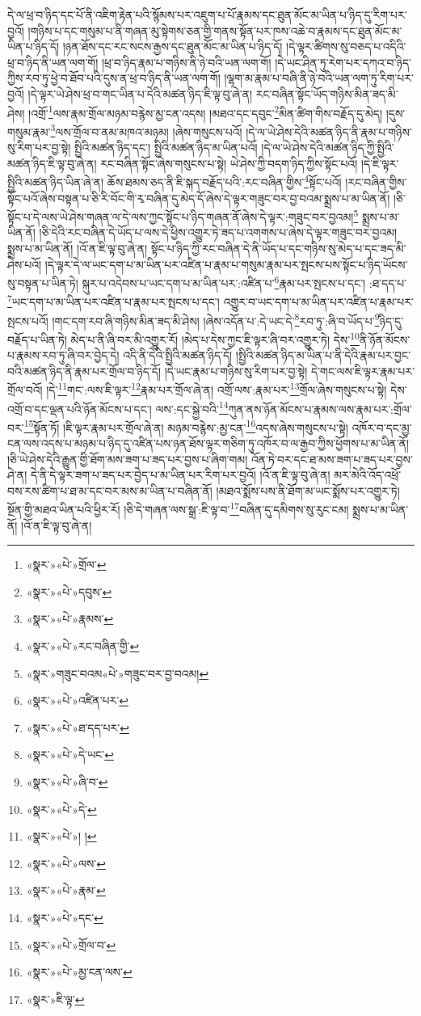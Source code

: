 དེ་ལ་ཕྲ་བ་ཉིད་དང་པོ་ནི་འཇིག་རྟེན་པའི་སྙོམས་པར་འཇུག་པ་པོ་རྣམས་དང་ཐུན་མོང་མ་ཡིན་པ་ཉིད་དུ་རིག་པར་བྱའོ། །གཉིས་པ་དང་གསུམ་པ་ནི་གཞན་མུ་སྟེགས་ཅན་གྱི་གནས་སྟོན་པར་ཁས་འཆེ་བ་རྣམས་དང་ཐུན་མོང་མ་ཡིན་པ་ཉིད་དོ། །ཉན་ཐོས་དང་རང་སངས་རྒྱས་དང་ཐུན་མོང་མ་ཡིན་པ་ཉིད་དོ། །དེ་ལྟར་ཚིགས་སུ་བཅད་པ་འདིའི་ཕྲ་བ་ཉིད་ནི་ཡན་ལག་གོ། །ཕྲ་བ་ཉིད་རྣམ་པ་གཉིས་ནི་ཉེ་བའི་ཡན་ལག་གོ། །དེ་ཡང་ཤིན་ཏུ་རེག་པར་དཀའ་བ་ཉིད་ཀྱིས་རབ་ཏུ་ཕྱེ་བ་ཐོབ་པའི་དུས་ན་ཕྲ་བ་ཉིད་ནི་ཡན་ལག་གོ། །ལྷག་མ་རྣམ་པ་བཞི་ནི་ཉེ་བའི་ཡན་ལག་ཏུ་རིག་པར་བྱའོ། །དེ་ལྟར་ཡེ་ཤེས་ཕྲ་བ་གང་ཡིན་པ་དེའི་མཚན་ཉིད་ཇི་ལྟ་བུ་ཞེ་ན། རང་བཞིན་སྟོང་ཡོད་གཉིས་མིན་ཟད་མི་ཤེས། །འགྲོ་\footnote{«སྣར་»«པེ་»གྲོལ་}ལས་རྣམ་གྲོལ་མཉམ་བརྙེས་མྱ་ངན་འདས། །མཐའ་དང་དབུང་\footnote{«སྣར་»«པེ་»དབུས་}མིན་ཚིག་གིས་བརྗོད་དུ་མེད། །དུས་གསུམ་རྣམ་\footnote{«སྣར་»«པེ་»རྣམས་}ལས་གྲོལ་བ་ནམ་མཁའ་མཉམ། །ཞེས་གསུངས་པའོ། །དེ་ལ་ཡེ་ཤེས་དེའི་མཚན་ཉིད་ནི་རྣམ་པ་གཉིས་སུ་རིག་པར་བྱ་སྟེ། སྤྱིའི་མཚན་ཉིད་དང་། སྤྱིའི་མཚན་ཉིད་མ་ཡིན་པའོ། །དེ་ལ་ཡེ་ཤེས་དེའི་མཚན་ཉིད་ཀྱི་སྤྱིའི་མཚན་ཉིད་ཇི་ལྟ་བུ་ཞེ་ན། རང་བཞིན་སྟོང་ཞེས་གསུངས་པ་སྟེ། ཡེ་ཤེས་ཀྱི་བདག་ཉིད་ཀྱིས་སྟོང་པའོ། །དེ་ཇི་ལྟར་སྤྱིའི་མཚན་ཉིད་ཡིན་ཞེ་ན། ཆོས་ཐམས་ཅད་ནི་ཇི་སྐད་བརྗོད་པའི་:རང་བཞིན་གྱིས་\footnote{«སྣར་»«པེ་»རང་བཞིན་གྱི་}སྟོང་པའོ། །རང་བཞིན་གྱིས་སྟོང་པའོ་ཞེས་བསྟན་པ་ཅི་རི་བོང་གི་རྭ་བཞིན་དུ་མེད་དོ་ཞེས་དེ་ལྟར་གཟུང་བར་བྱ་བའམ་སྨྲས་པ་མ་ཡིན་ནོ། །ཅི་སྟོང་པ་དེ་ལས་ཡེ་ཤེས་གཞན་ལ་དེ་ལས་ཀྱང་སྟོང་པ་ཉིད་གཞན་ནོ་ཞེས་དེ་ལྟར་:གཟུང་བར་བྱའམ།\footnote{«སྣར་»གཟུང་བའམ«པེ་»གཟུང་བར་བྱ་བའམ།} སྨྲས་པ་མ་ཡིན་ནོ། །ཅི་དེའི་རང་བཞིན་དེ་ཡོད་པ་ལས་དེ་ཕྱིས་འགྱུར་ཏེ་ཟད་པ་འགགས་པ་ཞེས་དེ་ལྟར་གཟུང་བར་བྱའམ། སྨྲས་པ་མ་ཡིན་ནོ། །འོ་ན་ཇི་ལྟ་བུ་ཞེ་ན། སྟོང་པ་ཉིད་ཀྱི་རང་བཞིན་དེ་ནི་ཡོད་པ་དང་གཉིས་སུ་མེད་པ་དང་ཟད་མི་ཤེས་པའོ། །དེ་ལྟར་དེ་ལ་ཡང་དག་པ་མ་ཡིན་པར་འཛིན་པ་རྣམ་པ་གསུམ་རྣམ་པར་སྤངས་པས་སྟོང་པ་ཉིད་ཡོངས་སུ་བསྟན་པ་ཡིན་ཏེ། སྐུར་པ་འདེབས་པ་ཡང་དག་པ་མ་ཡིན་པར་:འཛིན་པ་\footnote{«སྣར་»«པེ་»འཛིན་པར་}རྣམ་པར་སྤངས་པ་དང་། :ཐ་དད་པ་\footnote{«སྣར་»«པེ་»ཐ་དད་པར་}ཡང་དག་པ་མ་ཡིན་པར་འཛིན་པ་རྣམ་པར་སྤངས་པ་དང་། འགྱུར་བ་ཡང་དག་པ་མ་ཡིན་པར་འཛིན་པ་རྣམ་པར་སྤངས་པའོ། །གང་དག་རབ་ཞི་གཉིས་མིན་ཟད་མི་ཤེས། །ཞེས་འདོན་པ་:དེ་ཡང་དེ་\footnote{«སྣར་»«པེ་»དེ་ཡང་}རབ་ཏུ་:ཞི་བ་ཡོད་པ་\footnote{«སྣར་»«པེ་»ཞི་བ་}ཉིད་དུ་བརྗོད་པ་ཡིན་ཏེ། མེད་པ་ནི་ཞི་བར་མི་འགྱུར་རོ། །མེད་པ་དེས་ཀྱང་ཇི་ལྟར་ཞི་བར་འགྱུར་ཏེ། དེས་\footnote{«སྣར་»«པེ་»དེ་}ནི་ཉོན་མོངས་པ་རྣམས་རབ་ཏུ་ཞི་བར་བྱེད་དེ། འདི་ནི་དེའི་སྤྱིའི་མཚན་ཉིད་དོ། །སྤྱིའི་མཚན་ཉིད་མ་ཡིན་པ་ནི་དེའི་རྣམ་པར་བྱང་བའི་མཚན་ཉིད་ནི་རྣམ་པར་གྲོལ་བ་ཉིད་དོ། །དེ་ཡང་རྣམ་པ་གཉིས་སུ་རིག་པར་བྱ་སྟེ། དེ་གང་ལས་ཇི་ལྟར་རྣམ་པར་གྲོལ་བའོ། །དེ་\footnote{«སྣར་»«པེ་»། །}གང་:ལས་ཇི་ལྟར་\footnote{«སྣར་»«པེ་»ལས་}རྣམ་པར་གྲོལ་ཞེ་ན། འགྲོ་ལས་:རྣམ་པར་\footnote{«སྣར་»«པེ་»རྣམ་}གྲོལ་ཞེས་གསུངས་པ་སྟེ། དེས་འགྲོ་བ་དང་ལྡན་པའི་ཉོན་མོངས་པ་དང་། ལས་:དང་སྐྱེ་བའི་\footnote{«སྣར་»«པེ་»དང་}ཀུན་ནས་ཉོན་མོངས་པ་རྣམས་ལས་རྣམ་པར་:གྲོལ་བར་\footnote{«སྣར་»«པེ་»གྲོལ་བ་}སྟོན་ཏོ། །ཇི་ལྟར་རྣམ་པར་གྲོལ་ཞེ་ན། མཉམ་བརྙེས་:མྱ་ངན་\footnote{«སྣར་»«པེ་»མྱ་ངན་ལས་}འདས་ཞེས་གསུངས་པ་སྟེ། འཁོར་བ་དང་མྱ་ངན་ལས་འདས་པ་མཉམ་པ་ཉིད་དུ་འཛིན་པས་ཉན་ཐོས་ལྟར་གཅིག་ཏུ་འཁོར་བ་ལ་རྒྱབ་ཀྱིས་ཕྱོགས་པ་མ་ཡིན་ནོ། །ཅི་ཡེ་ཤེས་དེའི་རྒྱུན་གྱི་ཐོག་མས་ཟག་པ་ཟད་པར་བྱས་པ་ཞིག་གམ། འོན་ཏེ་བར་དང་ཐ་མས་ཟག་པ་ཟད་པར་བྱས་ཤེ་ན། དེ་ནི་དེ་ལྟར་ཟག་པ་ཟད་པར་བྱེད་པ་མ་ཡིན་པར་རིག་པར་བྱའོ། །འོ་ན་ཇི་ལྟ་བུ་ཞེ་ན། མར་མེའི་འོད་འཕྲོ་བས་རས་ཚིག་པ་ཐ་མ་དང་བར་མས་མ་ཡིན་པ་བཞིན་ནོ། །མཐའ་སྨོས་པས་ནི་ཐོག་མ་ཡང་སྨོས་པར་འགྱུར་ཏེ། སྔོན་གྱི་མཐའ་ཡིན་པའི་ཕྱིར་རོ། །ཅི་དེ་གཞན་ལས་སྒྲ་:ཇི་ལྟ་བ་\footnote{«སྣར་»ཇི་ལྟ་}བཞིན་དུ་དམིགས་སུ་རུང་ངམ། སྨྲས་པ་མ་ཡིན་ནོ། །འོ་ན་ཇི་ལྟ་བུ་ཞེ་ན། 